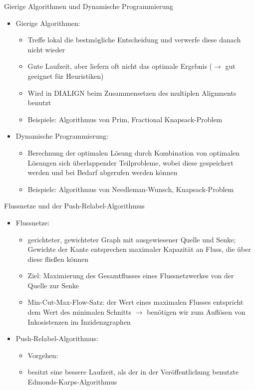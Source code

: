 \documentclass[wide,xcolor={x11names},hyperref={colorlinks=false},pantone312]{beamer}
\begin{document}
\begin{frame}[t]{Gierige Algorithmen und Dynamische Programmierung}
	\begin{itemize}
		\item Gierige Algorithmen:
		\begin{itemize}
			\item Treffe lokal die bestmögliche Entscheidung und verwerfe diese danach nicht wieder
			\item Gute Laufzeit, aber liefern oft nicht das optimale Ergebnis ($\rightarrow$ gut geeignet für Heuristiken)
			\item Wird in DIALIGN beim Zusammensetzen des multiplen Alignments benutzt
			\item Beispiele: Algorithmus von Prim, Fractional Knapsack-Problem
		\end{itemize} \pause
		\item Dynamische Programmierung:
		\begin{itemize}
			\item Berechnung der optimalen Lösung durch Kombination von optimalen Lösungen sich überlappender Teilprobleme, wobei diese gespeichert werden und bei Bedarf abgerufen werden können
			\item Beispiele: Algorithmus von Needleman-Wunsch, Knapsack-Problem
		\end{itemize}
	\end{itemize}
\end{frame}

\begin{frame}[t]{Flussnetze und der Push-Relabel-Algorithmus}
	\begin{itemize}
		\item Flussnetze:
		\begin{itemize}
			\item gerichteter, gewichteter Graph mit ausgewiesener Quelle und Senke; Gewichte der Kante entsprechen maximaler Kapazität an Fluss, die über diese fließen können
			\item Ziel: Maximierung des Gesamtflusses eines Flussnetzwerkes von der Quelle zur Senke
			\item Min-Cut-Max-Flow-Satz: der Wert eines maximalen Flusses entspricht dem Wert des minimalen Schnitts $\rightarrow$ benötigen wir zum Auflösen von Inkosistenzen im Inzidenzgraphen 
		\end{itemize} \pause
		\item Push-Relabel-Algorithmus:
		\begin{itemize}
			\item Vorgehen:
			\item besitzt eine bessere Laufzeit, als der in der Veröffentlichung benutzte Edmonds-Karps-Algorithmus
		\end{itemize}
	\end{itemize}
\end{frame}
\end{document}
